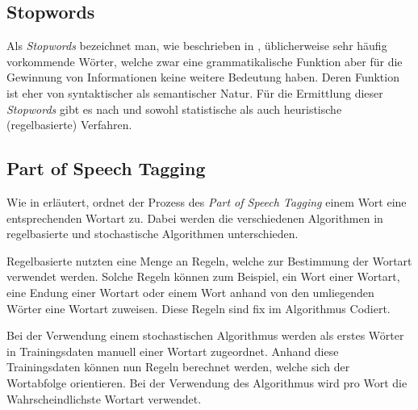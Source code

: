 
\subsection{Stopwords}


Als \textit{Stopwords} bezeichnet man, wie beschrieben in \cite{manning2008introduction}, üblicherweise sehr häufig vorkommende Wörter, welche zwar eine grammatikalische Funktion aber für die Gewinnung von Informationen keine weitere Bedeutung haben. Deren Funktion ist eher von syntaktischer als semantischer Natur. Für die Ermittlung dieser \textit{Stopwords} gibt es nach \cite{manning2008introduction} und \cite{wilbur1992automatic} sowohl statistische als auch heuristische (regelbasierte) Verfahren.


\subsection{Part of Speech Tagging}\label{part-of-speech}



Wie in \cite{manning1999foundations,brill1992simple,brill1994some} erläutert, ordnet der Prozess des \textit{Part of Speech Tagging} einem Wort eine entsprechenden Wortart zu. Dabei werden die verschiedenen Algorithmen in regelbasierte und stochastische Algorithmen unterschieden. 

Regelbasierte nutzten eine Menge an Regeln, welche zur Bestimmung der Wortart verwendet werden. Solche Regeln können zum Beispiel, ein Wort einer Wortart, eine Endung einer Wortart oder einem Wort anhand von den umliegenden Wörter eine Wortart zuweisen. Diese Regeln sind fix im Algorithmus Codiert. 

Bei der Verwendung einem stochastischen Algorithmus werden als erstes Wörter in Trainingsdaten manuell einer Wortart zugeordnet. Anhand diese Trainingsdaten können nun Regeln berechnet werden, welche sich der Wortabfolge orientieren. Bei der Verwendung des Algorithmus wird pro Wort die Wahrscheindlichste Wortart verwendet.


